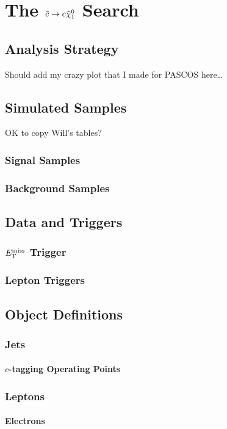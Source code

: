 \chapter{The $\tilde{c} \to c \tilde{\chi}_1^0$ Search}

\section{Analysis Strategy}
\label{sec:analysis-strategy}
Should add my crazy plot that I made for PASCOS here\ldots

\section{Simulated Samples}
OK to copy Will's tables?
\subsection{Signal Samples}
\subsection{Background Samples}

\section{Data and Triggers}
\subsection{$E_{\rm T}^{\rm miss}$ Trigger}
\subsection{Lepton Triggers}

\section{Object Definitions}
\subsection{Jets}
\subsubsection{$c$-tagging Operating Points}
\subsection{Leptons}
\subsubsection{Electrons}
